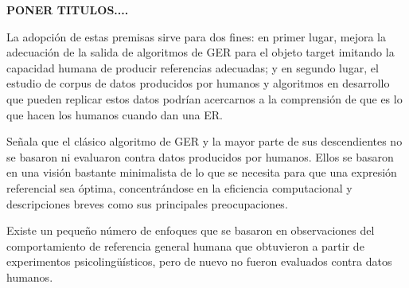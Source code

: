\textbf{PONER TITULOS....}

La adopci\'on de estas premisas sirve para dos fines: en primer lugar, mejora la adecuaci\'on
de la salida de algoritmos de GER para el objeto target imitando la capacidad humana
de producir referencias adecuadas; y en segundo lugar, el estudio de corpus de datos producidos por humanos
 y algoritmos en desarrollo que pueden replicar estos datos podr\'ian
acercarnos a la comprensi\'on de que es lo que hacen los humanos cuando dan una ER.

Se\~nala que el cl\'asico algoritmo de GER y la mayor parte de sus descendientes no se basaron ni evaluaron contra datos producidos por humanos. Ellos se basaron en una visi\'on bastante minimalista de lo que se necesita
para que una expresi\'on referencial sea \'optima, concentr\'andose en la eficiencia computacional 
 y descripciones breves como sus principales preocupaciones.

 Existe un peque\~no n\'umero de enfoques que 
 se basaron en observaciones del comportamiento de referencia general humana
que obtuvieron a partir de experimentos psicoling\"u\'isticos, pero de nuevo no fueron evaluados
contra datos humanos.


